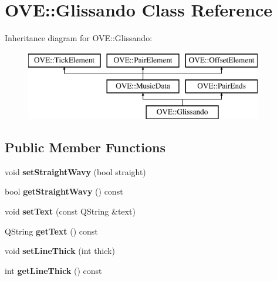 \hypertarget{class_o_v_e_1_1_glissando}{}\section{O\+VE\+:\+:Glissando Class Reference}
\label{class_o_v_e_1_1_glissando}
Inheritance diagram for O\+VE\+:\+:Glissando\+:\begin{figure}[H]
\begin{center}
\leavevmode
\includegraphics[height=3.000000cm]{class_o_v_e_1_1_glissando}
\end{center}
\end{figure}
\subsection*{Public Member Functions}
\begin{DoxyCompactItemize}
\item 
\mbox{\label{class_o_v_e_1_1_glissando_a5a5980e6035fb8ddabfdecdac4331ac6}} 
void {\bfseries set\+Straight\+Wavy} (bool straight)
\item 
\mbox{\label{class_o_v_e_1_1_glissando_a69562d2ca74a975e518241fa4c224c62}} 
bool {\bfseries get\+Straight\+Wavy} () const
\item 
\mbox{\label{class_o_v_e_1_1_glissando_aa83ee1edd1f6025217afb4a511b2e5d0}} 
void {\bfseries set\+Text} (const Q\+String \&text)
\item 
\mbox{\label{class_o_v_e_1_1_glissando_ae7d7b8ecb39875598937e17a0bd61fdc}} 
Q\+String {\bfseries get\+Text} () const
\item 
\mbox{\label{class_o_v_e_1_1_glissando_a87a0b317bf993c3219c568d3850f0b5c}} 
void {\bfseries set\+Line\+Thick} (int thick)
\item 
\mbox{\label{class_o_v_e_1_1_glissando_a83ed93c7bec066d408451a0df54502b2}} 
int {\bfseries get\+Line\+Thick} () const
\end{DoxyCompactItemize}
